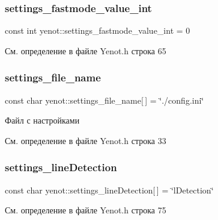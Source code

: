 \mbox{\label{namespaceyenot_aee49fb849c0951972cdac7466599314a}} 
\subsubsection{\texorpdfstring{settings\+\_\+fastmode\+\_\+value\+\_\+int}{settings\_fastmode\_value\_int}}
{\footnotesize\ttfamily const int yenot\+::settings\+\_\+fastmode\+\_\+value\+\_\+int = 0}



См. определение в файле Yenot.\+h строка 65

\mbox{\label{namespaceyenot_adc33110d5c91abdee044c45cd5c725b1}} 
\subsubsection{\texorpdfstring{settings\+\_\+file\+\_\+name}{settings\_file\_name}}
{\footnotesize\ttfamily const char yenot\+::settings\+\_\+file\+\_\+name\mbox{[}$\,$\mbox{]} = \char`\"{}./config.\+ini\char`\"{}}



Файл с настройками 



См. определение в файле Yenot.\+h строка 33

\mbox{\label{namespaceyenot_a49dc5e175f5b81894abe218db8949a89}} 
\subsubsection{\texorpdfstring{settings\+\_\+line\+Detection}{settings\_lineDetection}}
{\footnotesize\ttfamily const char yenot\+::settings\+\_\+line\+Detection\mbox{[}$\,$\mbox{]} = \char`\"{}l\+Detection\char`\"{}}



См. определение в файле Yenot.\+h строка 75

